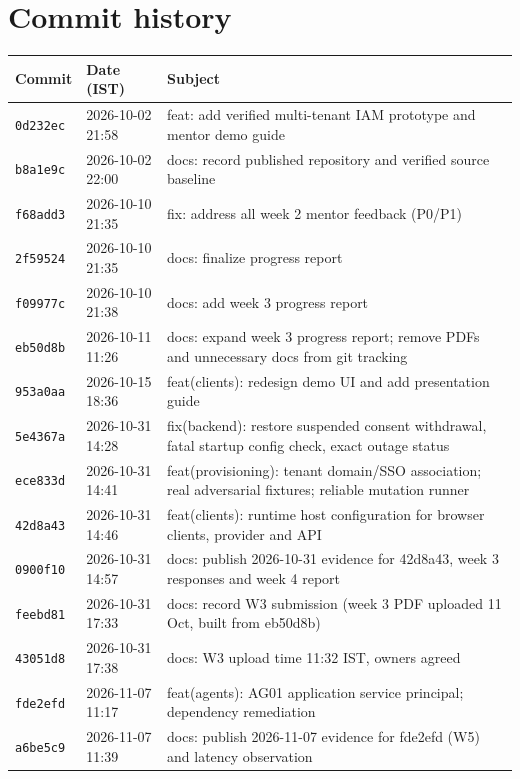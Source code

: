 \section{Commit history}
\label{app:commits}
\begin{longtable}{@{}P{1.5cm} P{2.6cm} P{9.8cm}@{}}
\toprule
\textbf{Commit} & \textbf{Date (IST)} & \textbf{Subject}\\
\midrule
\endhead
\texttt{0d232ec} & 2026-10-02 21:58 & feat: add verified multi-tenant IAM prototype and mentor demo guide\\
\texttt{b8a1e9c} & 2026-10-02 22:00 & docs: record published repository and verified source baseline\\
\texttt{f68add3} & 2026-10-10 21:35 & fix: address all week 2 mentor feedback (P0/P1)\\
\texttt{2f59524} & 2026-10-10 21:35 & docs: finalize progress report\\
\texttt{f09977c} & 2026-10-10 21:38 & docs: add week 3 progress report\\
\texttt{eb50d8b} & 2026-10-11 11:26 & docs: expand week 3 progress report; remove PDFs and unnecessary docs from git tracking\\
\texttt{953a0aa} & 2026-10-15 18:36 & feat(clients): redesign demo UI and add presentation guide\\
\texttt{5e4367a} & 2026-10-31 14:28 & fix(backend): restore suspended consent withdrawal, fatal startup config check, exact outage status\\
\texttt{ece833d} & 2026-10-31 14:41 & feat(provisioning): tenant domain/SSO association; real adversarial fixtures; reliable mutation runner\\
\texttt{42d8a43} & 2026-10-31 14:46 & feat(clients): runtime host configuration for browser clients, provider and API\\
\texttt{0900f10} & 2026-10-31 14:57 & docs: publish 2026-10-31 evidence for 42d8a43, week 3 responses and week 4 report\\
\texttt{feebd81} & 2026-10-31 17:33 & docs: record W3 submission (week 3 PDF uploaded 11 Oct, built from eb50d8b)\\
\texttt{43051d8} & 2026-10-31 17:38 & docs: W3 upload time 11:32 IST, owners agreed\\
\texttt{fde2efd} & 2026-11-07 11:17 & feat(agents): AG01 application service principal; dependency remediation\\
\texttt{a6be5c9} & 2026-11-07 11:39 & docs: publish 2026-11-07 evidence for fde2efd (W5) and latency observation\\

\end{longtable}
